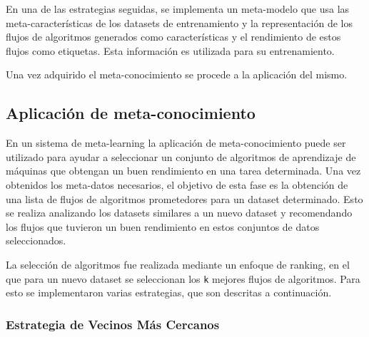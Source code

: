 En una de las estrategias seguidas, se implementa un meta-modelo que usa las meta-características de los datasets de entrenamiento y la representación de los flujos de algoritmos generados como características y el rendimiento de estos flujos como etiquetas. Esta información es utilizada para su entrenamiento.

Una vez adquirido el meta-conocimiento se procede a la aplicación del mismo.

\subsection{Aplicación de meta-conocimiento}\label{sub:aplicacion}


En un sistema de meta-learning la aplicación de meta-conocimiento puede ser utilizado para ayudar a seleccionar un conjunto de algoritmos de aprendizaje de máquinas que obtengan un buen rendimiento en una tarea determinada. Una vez obtenidos los meta-datos necesarios, el objetivo de esta fase es la obtención de una lista de flujos de algoritmos prometedores para un dataset determinado. Esto se realiza analizando los datasets similares a un nuevo dataset y recomendando los flujos que tuvieron un buen rendimiento en estos conjuntos de datos seleccionados. 

La selección de algoritmos fue realizada mediante un enfoque de ranking, en el que para un nuevo dataset se seleccionan los \texttt{k} mejores flujos de algoritmos. Para esto se implementaron varias estrategias, que son descritas a continuación.

\subsubsection{Estrategia de Vecinos Más Cercanos}\label{subsub:nn}


